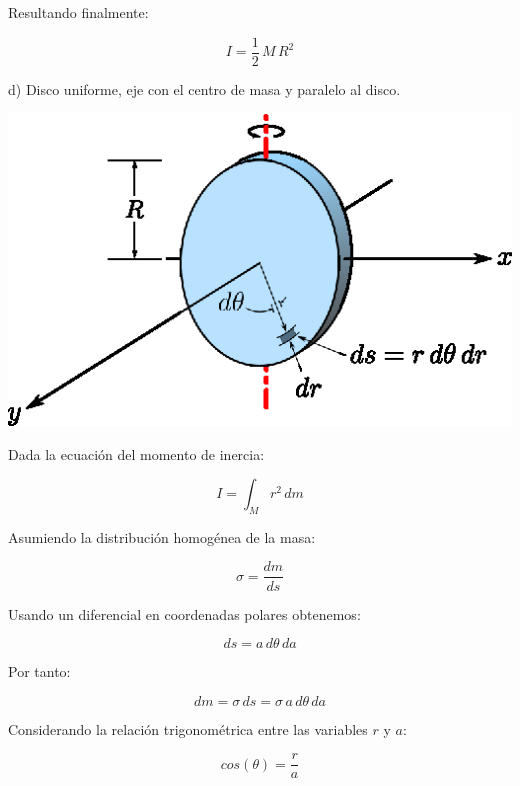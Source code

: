 \documentclass[letter,11pt]{article}
\begin{document}
Resultando finalmente:

\begin{equation}
    I = \frac{1}{2}\, M\, R^2
\end{equation}

\newpage
d) Disco uniforme, eje con el centro de masa y paralelo al disco.

\begin{center}
\includegraphics[scale=1.75]{resources/f4.eps}
\end{center}

Dada la ecuación del momento de inercia:

\begin{equation}
    I = \int_{M} r^2\, dm
\label{momentodeinercia4}
\end{equation}

Asumiendo la distribución homogénea de la masa:

\begin{equation*}
    \sigma = \frac{dm}{ds}
\end{equation*}

Usando un diferencial en coordenadas polares obtenemos:

\begin{equation*}
    ds = a\, d\theta\, da
\end{equation*}

Por tanto:

\begin{equation}
    dm = \sigma\, ds = \sigma\, a\, d\theta\, da
\label{dm4}
\end{equation}

Considerando la relación trigonométrica entre las variables $r$ y $a$:

\begin{equation*}
    cos (\theta) = \frac{r}{a}
\end{equation*}
\end{document}
